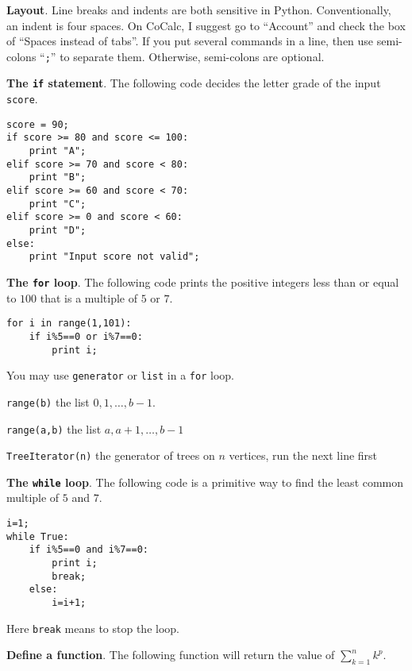 \documentclass{article}
\newcommand{\heading}[1]{\medskip\textbf{#1}.}
\newenvironment{lwdes}{\begin{description}[leftmargin=1.7cm,align=left,labelwidth=1.5cm]}{\end{description}}
\begin{document}
\begin{multicols}{2}
\heading{Layout}  Line breaks and indents are both sensitive in Python.  Conventionally, an indent is four spaces.  On CoCalc, I suggest go to ``Account'' and check the box of ``Spaces instead of tabs''.  If you put several commands in a line, then use semi-colons ``\texttt{;}'' to separate them.  Otherwise, semi-colons are optional.

\heading{The \texttt{if} statement}  The following code decides the letter grade of the input \texttt{score}.

\begin{verbatim}
score = 90;
if score >= 80 and score <= 100:
    print "A";
elif score >= 70 and score < 80:
    print "B";
elif score >= 60 and score < 70:
    print "C";
elif score >= 0 and score < 60:
    print "D";
else:
    print "Input score not valid";
\end{verbatim}

\heading{The \texttt{for} loop}  The following code prints the positive integers less than or equal to $100$ that is a multiple of $5$ or $7$.

\begin{verbatim}
for i in range(1,101):
    if i%5==0 or i%7==0:
        print i;
\end{verbatim}

You may use \texttt{generator} or \texttt{list} in a \texttt{for} loop.
\begin{lwdes}
\item[\texttt{range(b)}] the list $0,1,\ldots,b-1$.
\item[\texttt{range(a,b)}] the list $a,a+1,\ldots,b-1$
\item[\texttt{TreeIterator(n)}] the generator of trees on $n$ vertices, run the next line first\\
\end{lwdes}

\heading{The \texttt{while} loop}  The following code is a primitive way to find the least common multiple of $5$ and $7$.

\begin{verbatim}
i=1;
while True:
    if i%5==0 and i%7==0:
        print i;
        break;
    else:
        i=i+1;
\end{verbatim}

Here \texttt{break} means to stop the loop.

\heading{Define a function}  The following function will return  the value of $\sum_{k=1}^n k^p$.


\end{multicols}
\end{document}

